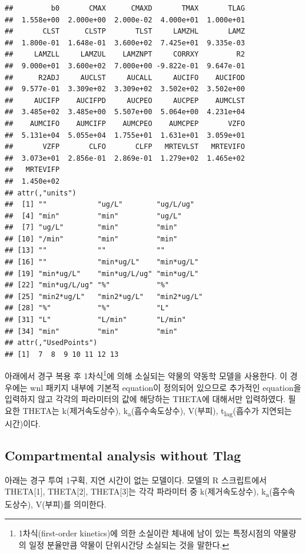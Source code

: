 \documentclass[
  11pt,
  krantz2, a4paper, twoside]{krantz}
\theoremstyle{definition}
\theoremstyle{definition}
\theoremstyle{definition}
\theoremstyle{definition}
\theoremstyle{remark}
\begin{document}
\begin{verbatim}
##         b0       CMAX      CMAXD       TMAX       TLAG 
##  1.558e+00  2.000e+00  2.000e-02  4.000e+01  1.000e+01 
##       CLST      CLSTP       TLST     LAMZHL       LAMZ 
##  1.800e-01  1.648e-01  3.600e+02  7.425e+01  9.335e-03 
##     LAMZLL     LAMZUL    LAMZNPT     CORRXY         R2 
##  9.000e+01  3.600e+02  7.000e+00 -9.822e-01  9.647e-01 
##      R2ADJ     AUCLST     AUCALL     AUCIFO    AUCIFOD 
##  9.577e-01  3.309e+02  3.309e+02  3.502e+02  3.502e+00 
##     AUCIFP    AUCIFPD     AUCPEO     AUCPEP    AUMCLST 
##  3.485e+02  3.485e+00  5.507e+00  5.064e+00  4.231e+04 
##    AUMCIFO    AUMCIFP    AUMCPEO    AUMCPEP       VZFO 
##  5.131e+04  5.055e+04  1.755e+01  1.631e+01  3.059e+01 
##       VZFP       CLFO       CLFP   MRTEVLST   MRTEVIFO 
##  3.073e+01  2.856e-01  2.869e-01  1.279e+02  1.465e+02 
##   MRTEVIFP 
##  1.450e+02 
## attr(,"units")
##  [1] ""            "ug/L"        "ug/L/ug"    
##  [4] "min"         "min"         "ug/L"       
##  [7] "ug/L"        "min"         "min"        
## [10] "/min"        "min"         "min"        
## [13] ""            ""            ""           
## [16] ""            "min*ug/L"    "min*ug/L"   
## [19] "min*ug/L"    "min*ug/L/ug" "min*ug/L"   
## [22] "min*ug/L/ug" "%"           "%"          
## [25] "min2*ug/L"   "min2*ug/L"   "min2*ug/L"  
## [28] "%"           "%"           "L"          
## [31] "L"           "L/min"       "L/min"      
## [34] "min"         "min"         "min"        
## attr(,"UsedPoints")
## [1]  7  8  9 10 11 12 13
\end{verbatim}

아래에서 경구 복용 후 1차식\footnote{1차식(first-order kinetics)에 의한 소실이란 체내에 남이 있는 특정시점의 약물량의 일정 분율만큼 약물이 단위시간당 소실되는 것을 말한다.}에 의해 소실되는 약물의 약동학 모델을 사용한다. 
이 경우에는 wnl 패키지 내부에 기본적 equation이 정의되어 있으므로 추가적인 equation을 입력하지 않고 각각의 파라미터의 값에 해당하는 THETA에 대해서만 입력하였다.
필요한 THETA는 k(제거속도상수), k\textsubscript{a}(흡수속도상수), V(부피), t\textsubscript{lag}(흡수가 지연되는 시간)이다.

\hypertarget{compartmental-analysis-without-tlag}{%
\subsection{Compartmental analysis without Tlag}\label{compartmental-analysis-without-tlag}}

아래는 경구 투여 1구획, 지연 시간이 없는 모델이다. 
모델의 R 스크립트에서 THETA{[}1{]}, THETA{[}2{]}, THETA{[}3{]}는 각각 파라미터 중 k(제거속도상수), k\textsubscript{a}(흡수속도상수), V(부피)를 의미한다.
\end{document}
